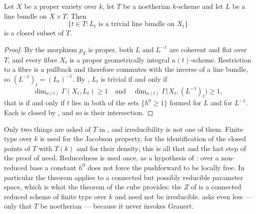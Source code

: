 \begin{corollary}
\label{cor:cube-triviality-closed}
Let $X$ be a proper variety over $k$, let $T$ be a noetherian $k$-scheme and
let $L$ be a line bundle on $X\times T$.  Then
\[
  \{t\in T:L_t\text{ is a trivial line bundle on }X_t\}
\]
is a closed subset of $T$.
\end{corollary}
\begin{proof}
By  the morphism $p_T$ is proper, both
$L$ and $L^{-1}$ are coherent and flat over $T$, and every fibre $X_t$ is a
proper geometrically integral $\kappa(t)$-scheme.  Restriction to a fibre is a
pullback and therefore commutes with the inverse of a line bundle, so
$(L^{-1})_t=(L_t)^{-1}$.  By , $L_t$ is
trivial if and only if
\[
  \dim_{\kappa(t)}\Gamma(X_t,L_t)\geq1
  \quad\text{and}\quad
  \dim_{\kappa(t)}\Gamma\bigl(X_t,(L^{-1})_t\bigr)\geq1 ,
\]
that is if and only if $t$ lies in both of the sets $\{h^0\geq1\}$ formed for
$L$ and for $L^{-1}$.  Each is closed by , and
so is their intersection.
\end{proof}

\begin{remark}\label{rem:cube-seesaw-base}
Only two things are asked of $T$ in , and irreducibility
is not one of them.  Finite type over $k$ is used for the Jacobson property,
for the identification of the closed points of $T$ with $T(k)$ and for their
density; this is all that  and the last step of the
proof of  need.  Reducedness is used once, as a
hypothesis of : over a non-reduced base a constant
$h^0$ does not force the pushforward to be locally free.  In particular the
theorem applies to a connected but possibly reducible parameter space, which
is what the theorem of the cube provides: the $Z$ of  is
a connected reduced scheme of finite type over $k$ and need not be
irreducible.   asks even less --- only that
$T$ be noetherian --- because it never invokes Grauert.
\end{remark}

